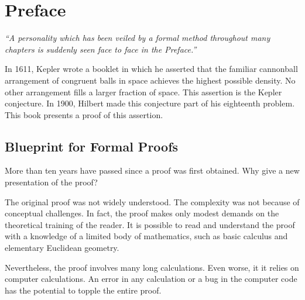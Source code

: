 
\chapter*{Preface}

{

\narrower

{\it ``A personality which has been veiled by a formal method
  throughout many chapters is suddenly seen face to face in the
  Preface.'' }

}

\bigskip


\bigskip

In 1611, Kepler wrote a booklet in which he asserted that the familiar
cannonball arrangement of congruent balls in space achieves the
highest possible density.  No other arrangement fills a larger
fraction of space.  This assertion is the Kepler conjecture.  In 1900,
Hilbert made this conjecture part of his eighteenth problem.  This
book presents a proof of this assertion.

\section*{Blueprint for Formal Proofs}

More than ten years have passed since a proof was first
obtained. Why give a new presentation of the proof?

The original proof was not widely understood.  The complexity was not
because of conceptual challenges.  In fact, the proof makes only
modest demands on the theoretical training of the reader.  It is
possible to read and understand the proof with a knowledge of a
limited body of mathematics, such as basic calculus and elementary
Euclidean geometry.

Nevertheless, the proof involves many long calculations. Even worse,
it it relies on computer calculations.  An error in any calculation or
a bug in the computer code has the potential to topple the entire
proof.

